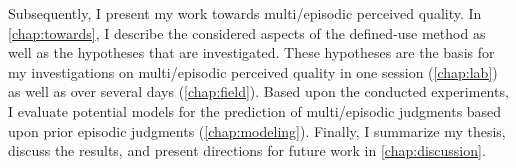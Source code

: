 Subsequently, I present my work towards multi\-/episodic perceived quality. %
In \autoref{chap:towards}, I describe the considered aspects of the defined-use method as well as the hypotheses that are investigated.
These hypotheses are the basis for my investigations on multi\-/episodic perceived quality in one session (\autoref{chap:lab}) as well as over several days (\autoref{chap:field}).
Based upon the conducted experiments, I evaluate potential models for the prediction of multi\-/episodic judgments based upon prior episodic judgments (\autoref{chap:modeling}).
Finally, I summarize my thesis, discuss the results, and present directions for future work in \autoref{chap:discussion}.